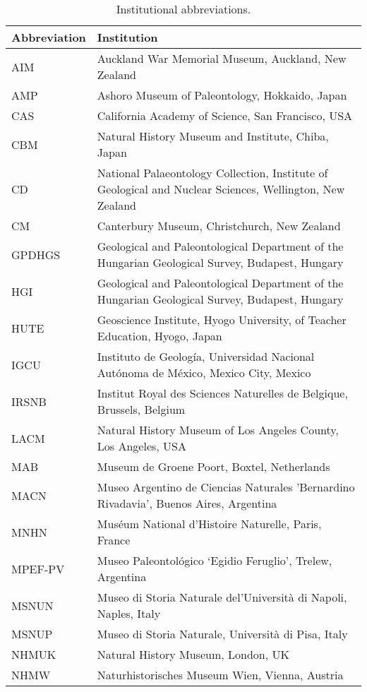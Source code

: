 \begin{longtable}{ll}

\caption{Institutional abbreviations.}\\

\hline
\textbf{Abbreviation} & \textbf{Institution}\\
\hline
AIM &
Auckland War Memorial Museum, Auckland, New Zealand\\
AMP &
Ashoro Museum of Paleontology, Hokkaido, Japan\\
CAS &
California Academy of Science, San Francisco, USA\\
CBM &
Natural History Museum and Institute, Chiba, Japan\\
CD &
National Palaeontology Collection, Institute of Geological and Nuclear Sciences, Wellington, New Zealand\\
CM &
Canterbury Museum, Christchurch, New Zealand\\
GPDHGS &
Geological and Paleontological Department of the Hungarian Geological Survey, Budapest, Hungary\\
HGI &
Geological and Paleontological Department of the Hungarian Geological Survey, Budapest, Hungary\\
HUTE &
Geoscience Institute, Hyogo University, of Teacher Education, Hyogo, Japan\\
IGCU &
Instituto de Geolog\'{i}a, Universidad Nacional Aut\'{o}noma de M\'{e}xico, Mexico City, Mexico\\
IRSNB &
Institut Royal des Sciences Naturelles de Belgique, Brussels, Belgium\\
LACM &
Natural History Museum of Los Angeles County, Los Angeles, USA\\
MAB &
Museum de Groene Poort, Boxtel, Netherlands\\
MACN &
Museo Argentino de Ciencias Naturales 'Bernardino Rivadavia', Buenos Aires, Argentina\\
MNHN &
Mus\'{e}um National d'Histoire Naturelle, Paris, France\\
MPEF-PV &
Museo Paleontol\'{o}gico `Egidio Feruglio', Trelew, Argentina\\
MSNUN &
Museo di Storia Naturale del'Universit\`{a} di Napoli, Naples, Italy\\
MSNUP &
Museo di Storia Naturale, Universit\`{a} di Pisa, Italy\\
NHMUK &
Natural History Museum, London, UK\\
NHMW &
Naturhistorisches Museum Wien, Vienna, Austria\\

\end{longtable}
